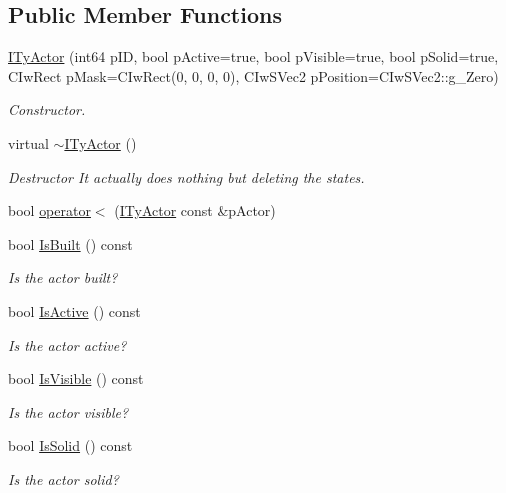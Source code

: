 \subsection*{Public Member Functions}
\begin{DoxyCompactItemize}
\item 
\hyperlink{class_i_ty_actor_afb266117deb0b8be81325ce76ef7c95b}{ITyActor} (int64 pID, bool pActive=true, bool pVisible=true, bool pSolid=true, CIwRect pMask=CIwRect(0, 0, 0, 0), CIwSVec2 pPosition=CIwSVec2::g\_\-Zero)
\begin{DoxyCompactList}\small\item\em Constructor. \end{DoxyCompactList}\item 
virtual \hyperlink{class_i_ty_actor_afc1f27393487c6422303523195c3922c}{$\sim$ITyActor} ()
\begin{DoxyCompactList}\small\item\em Destructor It actually does nothing but deleting the states. \end{DoxyCompactList}\item 
bool \hyperlink{class_i_ty_actor_aa988ea01f7b61556918f02ba184b60b3}{operator$<$} (\hyperlink{class_i_ty_actor}{ITyActor} const \&pActor)
\item 
bool \hyperlink{class_i_ty_actor_af3670099e1c1e77d620c43125dac6e61}{IsBuilt} () const 
\begin{DoxyCompactList}\small\item\em Is the actor built? \end{DoxyCompactList}\item 
bool \hyperlink{class_i_ty_actor_abe293544e0a3823400aaf490b24ae81d}{IsActive} () const 
\begin{DoxyCompactList}\small\item\em Is the actor active? \end{DoxyCompactList}\item 
bool \hyperlink{class_i_ty_actor_a5e3d6f0fd5ab67afb6d56488b7a55595}{IsVisible} () const 
\begin{DoxyCompactList}\small\item\em Is the actor visible? \end{DoxyCompactList}\item 
bool \hyperlink{class_i_ty_actor_a5c1f9e77b0e5903c1f63ac5e2b2c42ad}{IsSolid} () const 
\begin{DoxyCompactList}\small\item\em Is the actor solid? \end{DoxyCompactList}\item 

\end{DoxyCompactItemize}
